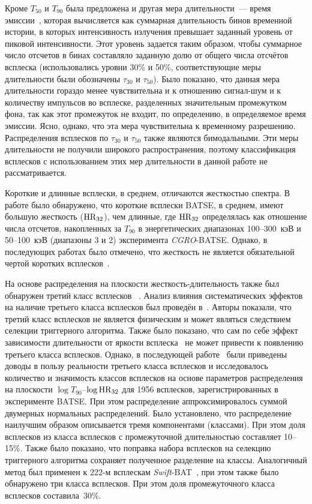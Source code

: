 Кроме $T_{50}$ и $T_{90}$ была предложена и другая мера длительности~--- время 
эмиссии~\citep{Mitrofanov_1999}, которая вычисляется как суммарная длительность 
бинов временной истории, в которых интенсивность излучения превышает заданный 
уровень от пиковой интенсивности. Этот уровень задается таким образом, чтобы 
суммарное число отсчетов в бинах составляло заданную долю от общего числа отсчётов 
всплеска (использовались уровни 30\% и 50\%, соответствующие меры длительности 
были обозначены $\tau_{30}$ и $\tau_{50}$). Было показано, что данная мера 
длительности гораздо менее чувствительна и к отношению сигнал-шум и к количеству 
импульсов во всплеске, разделенных значительным промежутком фона, так как этот 
промежуток не входит, по определению, в определяемое время эмиссии. Ясно, однако, 
что эта мера чувствительна к временному разрешению. Распределения всплесков 
по $\tau_{30}$ и $\tau_{50}$  также являются бимодальными. Эти меры длительности 
не получили широкого распространения, поэтому классификация всплесков 
с использованием этих мер длительности в данной работе не рассматривается. 

Короткие и длинные всплески, в среднем, отличаются жесткостью спектра.
В работе \citep{Kouveliotou_1993} было обнаружено, что короткие всплески BATSE, в 
среднем, имеют большую жесткость (${\mathrm{HR}}_{32}$), чем длинные, где ${\mathrm{HR}}_{32}$ определялась 
как отношение числа отсчетов, накопленных за $T_{90}$ в энергетических 
диапазонах 100--300~кэВ и 50--100~кэВ (диапазоны 3 и 2) эксперимента \textit{CGRO}-BATSE. 
Однако, в последующих работах было отмечено, что жесткость не является обязательной чертой 
коротких всплесков~\citep[см. например][]{Sakamoto_2006_proc, Norris_and_Bonnel_2006ApJ}. 

На основе распределения на плоскости жесткость-длительность также был обнаружен 
третий класс всплесков ~\citep{Mukherjee_1998, Hakkila_2000}. Анализ влияния 
систематических эффектов на наличие третьего класса всплесков был проведён 
в~\citep{Hakkila_2003}. Авторы показали, что третий класс всплесков не является 
физическим и может являться следствием селекции триггерного алгоритма. Также было 
показано, что сам по себе эффект зависимости длительности от яркости 
всплеска~\citep{Bonnell_1997} не может привести к появлению третьего класса всплесков. 
Однако, в последующей работе~\citep{Horvath_2006} были приведены доводы в пользу 
реальности третьего класса всплесков и исследовалось количество и значимость 
классов всплесков на основе параметров распределения на плоскости 
$\log T_{90}$--$\log {\mathrm{HR}}_{32}$ для 1956 всплесков, зарегистрированных 
в эксперименте BATSE. При этом распределение аппроксимировалось 
суммой двумерных нормальных распределений. Было установлено, что распределение 
наилучшим образом описывается тремя компонентами (классами). При этом доля всплесков 
из класса всплесков с промежуточной длительностью составляет 10--15\%. Также было показано, что поправка набора 
всплесков на селекцию триггерного алгоритма сохраняет полученное разделение на классы. 
Аналогичный метод был применен к 222-м всплескам \textit{Swift}-BAT~\citep{Horvath_2010}, 
при этом также было обнаружено три класса всплесков. При этом доля промежуточного 
класса всплесков составила~30\%.

